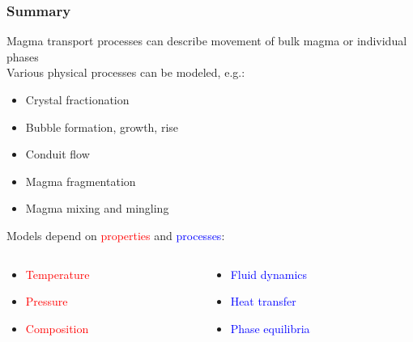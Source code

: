 \documentclass{beamer}
\begin{document}
\begin{frame}
  \frametitle{Summary}

  Magma transport processes can describe movement of bulk magma or individual phases \\

  Various physical processes can be modeled, e.g.:

  \begin{itemize}
  \item Crystal fractionation \\
  \item Bubble formation, growth, rise \\
  \item Conduit flow \\
  \item Magma fragmentation \\
  \item Magma mixing and mingling \\
  \end{itemize}

  \vspace{0.5cm}
    
  Models depend on \textcolor{red}{properties} and \textcolor{blue}{processes}:

    \vspace{- 0.5cm}
    
  \begin{columns}[t]

    \begin{column}{0.5\paperwidth}

      \begin{itemize}
        \item \textcolor{red}{Temperature} \\
        \item \textcolor{red}{Pressure} \\
        \item \textcolor{red}{Composition} \\
      \end{itemize}
      
    \end{column}

    \begin{column}{0.5\paperwidth}

      \begin{itemize}
      \item \textcolor{blue}{Fluid dynamics} \\
      \item \textcolor{blue}{Heat transfer} \\
      \item \textcolor{blue}{Phase equilibria} \\        
      \end{itemize}
      
    \end{column}
    
  \end{columns}
  
\end{frame}
\end{document}
